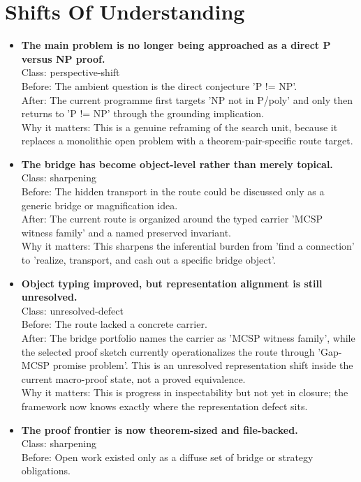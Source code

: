 \documentclass[11pt]{article}
\begin{document}
\section{Shifts Of Understanding}
\begin{itemize}[leftmargin=1.5em]
\item \textbf{The main problem is no longer being approached as a direct P versus NP proof.}
\\ Class: perspective-shift
\\ Before: The ambient question is the direct conjecture 'P != NP'.
\\ After: The current programme first targets 'NP not in P/poly' and only then returns to 'P != NP' through the grounding implication.
\\ Why it matters: This is a genuine reframing of the search unit, because it replaces a monolithic open problem with a theorem-pair-specific route target.
\item \textbf{The bridge has become object-level rather than merely topical.}
\\ Class: sharpening
\\ Before: The hidden transport in the route could be discussed only as a generic bridge or magnification idea.
\\ After: The current route is organized around the typed carrier 'MCSP witness family' and a named preserved invariant.
\\ Why it matters: This sharpens the inferential burden from 'find a connection' to 'realize, transport, and cash out a specific bridge object'.
\item \textbf{Object typing improved, but representation alignment is still unresolved.}
\\ Class: unresolved-defect
\\ Before: The route lacked a concrete carrier.
\\ After: The bridge portfolio names the carrier as 'MCSP witness family', while the selected proof sketch currently operationalizes the route through 'Gap-MCSP promise problem'. This is an unresolved representation shift inside the current macro-proof state, not a proved equivalence.
\\ Why it matters: This is progress in inspectability but not yet in closure; the framework now knows exactly where the representation defect sits.
\item \textbf{The proof frontier is now theorem-sized and file-backed.}
\\ Class: sharpening
\\ Before: Open work existed only as a diffuse set of bridge or strategy obligations.

\end{itemize}
\end{document}
